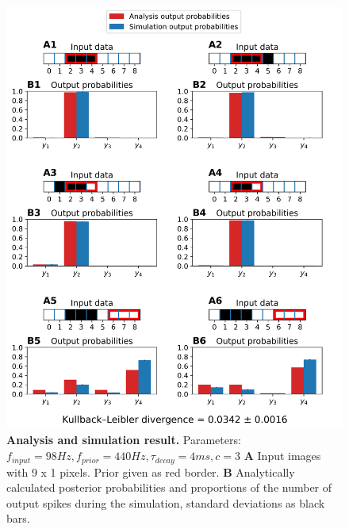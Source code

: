 \begin{figure}
  \includegraphics[width=\linewidth]{figures/1D/training/trainingEvaluation_98_440_4_c3.png}
      \caption{\textbf{Analysis and simulation result. } Parameters: $f_{input} = 98 Hz, f_{prior} = 440 Hz, \tau_{decay} = 4 ms, c = 3$ \textbf{A} Input images with 9 x 1 pixels. Prior given as red border. \textbf{B} Analytically calculated posterior probabilities and proportions of the number of output spikes during the simulation, standard deviations as black bars.}  
  \label{fig:1DTrainingEvaluationC3}
\end{figure}

